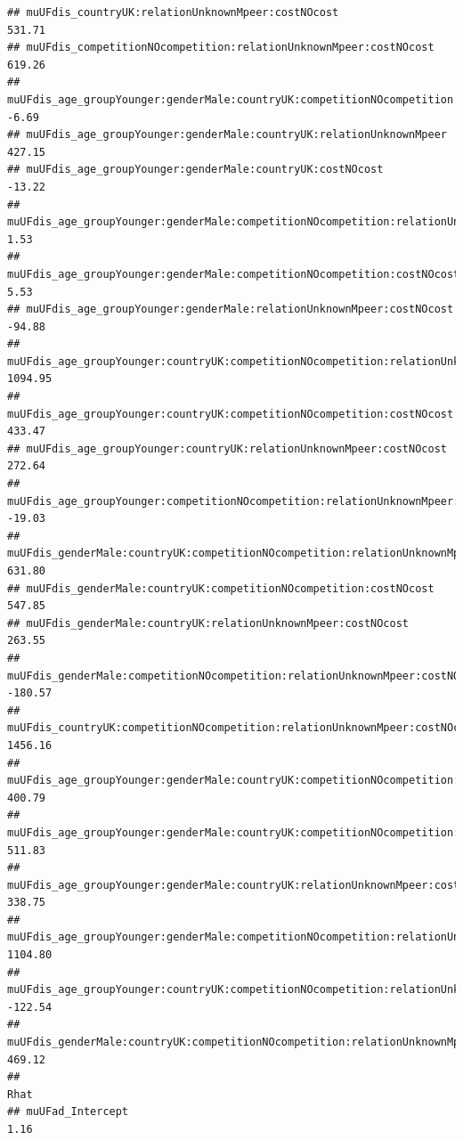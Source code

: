 \documentclass[
]{article}
\begin{document}
\begin{verbatim}
## muUFdis_countryUK:relationUnknownMpeer:costNOcost                                              531.71
## muUFdis_competitionNOcompetition:relationUnknownMpeer:costNOcost                               619.26
## muUFdis_age_groupYounger:genderMale:countryUK:competitionNOcompetition                          -6.69
## muUFdis_age_groupYounger:genderMale:countryUK:relationUnknownMpeer                             427.15
## muUFdis_age_groupYounger:genderMale:countryUK:costNOcost                                       -13.22
## muUFdis_age_groupYounger:genderMale:competitionNOcompetition:relationUnknownMpeer                1.53
## muUFdis_age_groupYounger:genderMale:competitionNOcompetition:costNOcost                          5.53
## muUFdis_age_groupYounger:genderMale:relationUnknownMpeer:costNOcost                            -94.88
## muUFdis_age_groupYounger:countryUK:competitionNOcompetition:relationUnknownMpeer              1094.95
## muUFdis_age_groupYounger:countryUK:competitionNOcompetition:costNOcost                         433.47
## muUFdis_age_groupYounger:countryUK:relationUnknownMpeer:costNOcost                             272.64
## muUFdis_age_groupYounger:competitionNOcompetition:relationUnknownMpeer:costNOcost              -19.03
## muUFdis_genderMale:countryUK:competitionNOcompetition:relationUnknownMpeer                     631.80
## muUFdis_genderMale:countryUK:competitionNOcompetition:costNOcost                               547.85
## muUFdis_genderMale:countryUK:relationUnknownMpeer:costNOcost                                   263.55
## muUFdis_genderMale:competitionNOcompetition:relationUnknownMpeer:costNOcost                   -180.57
## muUFdis_countryUK:competitionNOcompetition:relationUnknownMpeer:costNOcost                    1456.16
## muUFdis_age_groupYounger:genderMale:countryUK:competitionNOcompetition:relationUnknownMpeer    400.79
## muUFdis_age_groupYounger:genderMale:countryUK:competitionNOcompetition:costNOcost              511.83
## muUFdis_age_groupYounger:genderMale:countryUK:relationUnknownMpeer:costNOcost                  338.75
## muUFdis_age_groupYounger:genderMale:competitionNOcompetition:relationUnknownMpeer:costNOcost  1104.80
## muUFdis_age_groupYounger:countryUK:competitionNOcompetition:relationUnknownMpeer:costNOcost   -122.54
## muUFdis_genderMale:countryUK:competitionNOcompetition:relationUnknownMpeer:costNOcost          469.12
##                                                                                              Rhat
## muUFad_Intercept                                                                             1.16

\end{verbatim}
\end{document}
